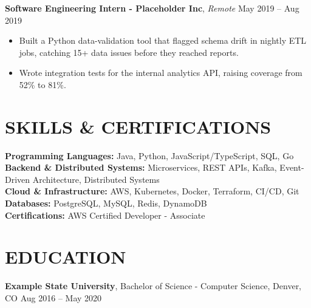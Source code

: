 \documentclass[10pt, letterpaper]{article}
\begin{document}
\textbf{Software Engineering Intern - Placeholder Inc}, \textit{Remote} \hfill May 2019 -- Aug 2019
\vspace{-0.6em}
\begin{itemize}[leftmargin=2em, itemsep=0pt, parsep=0pt]
    \item Built a Python data-validation tool that flagged schema drift in nightly ETL jobs, catching 15+ data issues before they reached reports.
    \item Wrote integration tests for the internal analytics API, raising coverage from 52\% to 81\%.
\end{itemize}
\vspace{-0.2em}


\section*{SKILLS \& CERTIFICATIONS}

\textbf{Programming Languages:} Java, Python, JavaScript/TypeScript, SQL, Go\\
\textbf{Backend \& Distributed Systems:} Microservices, REST APIs, Kafka, Event-Driven Architecture, Distributed Systems\\
\textbf{Cloud \& Infrastructure:} AWS, Kubernetes, Docker, Terraform, CI/CD, Git\\
\textbf{Databases:} PostgreSQL, MySQL, Redis, DynamoDB\\
\textbf{Certifications:} AWS Certified Developer - Associate


\section*{EDUCATION}

\textbf{Example State University}, Bachelor of Science - Computer Science, Denver, CO \hfill Aug 2016 -- May 2020
\end{document}
